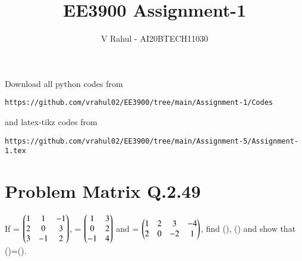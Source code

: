 \documentclass[journal,12pt,twocolumn]{IEEEtran}
\begin{document}
\title{EE3900 Assignment-1}
\author{V Rahul - AI20BTECH11030}
\maketitle
\newpage
\bigskip
\renewcommand{\thefigure}{\theenumi}
\renewcommand{\thetable}{\theenumi}
Download all python codes from 
\begin{lstlisting}
https://github.com/vrahul02/EE3900/tree/main/Assignment-1/Codes
\end{lstlisting}
%
and latex-tikz codes from 
%
\begin{lstlisting}
https://github.com/vrahul02/EE3900/tree/main/Assignment-5/Assignment-1.tex
\end{lstlisting}
\section*{Problem Matrix Q.2.49}
If  = $\begin{pmatrix}1 & 1 & -1\\2 & 0 & 3\\3 & -1 & 2\end{pmatrix}$,  = $\begin{pmatrix}1 & 3\\0 & 2\\-1 & 4\end{pmatrix}$ and  = $\begin{pmatrix}1 & 2 & 3 & -4\\2 & 0 & -2 & 1\end{pmatrix}$, find (), () and show that ()=().
\end{document}
